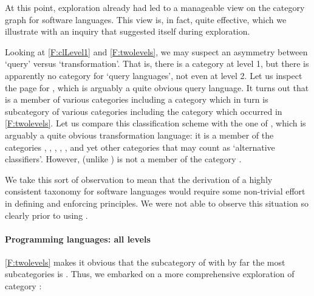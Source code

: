 At this point, exploration already had led to a manageable view on the category graph for software languages. This view is, in fact, quite effective, which we illustrate with an inquiry that suggested itself during exploration.

Looking at \autoref{F:clLevel1} and \autoref{F:twolevels}, we may suspect an asymmetry between `query' versus `transformation'. That is, there is a category  at level 1, but there is apparently no category for `query languages', not even at level 2. Let us inspect the page for , which is arguably a quite obvious query language. It turns out that  is a member of various categories including a category  which in turn is subcategory of various categories including the category  which occurred in \autoref{F:twolevels}. Let us compare this classification scheme with the one of , which is arguably a quite obvious transformation language: it is a member of the categories , , , , , and yet other categories that may count as `alternative classifiers'. However,  (unlike ) is not a member of the category .

We take this sort of observation to mean that the derivation of a highly consistent taxonomy for software languages would require some non-trivial effort in defining and enforcing principles. We were not able to observe this situation so clearly prior to using \WikiTax.


\paragraph*{\textbf{ Programming languages: all levels}}

\autoref{F:twolevels} makes it obvious that the subcategory of  with by far the most subcategories is 
. Thus, we embarked on a more comprehensive exploration of category :

